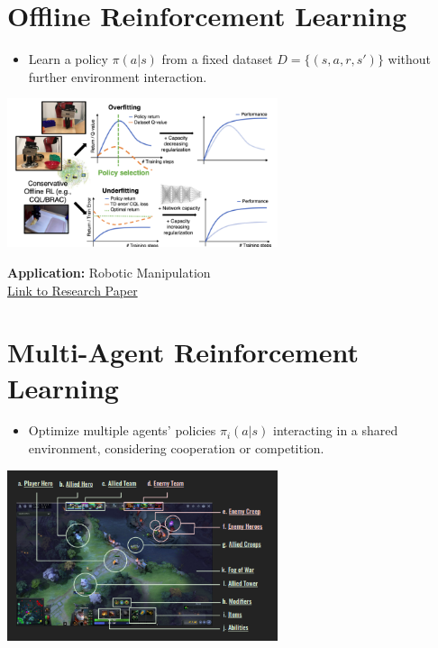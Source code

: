 \documentclass[
  letterpaper,
  DIV=11,
  numbers=noendperiod]{scrreprt}
\providecommand{\tightlist}{%
  \setlength{\itemsep}{0pt}\setlength{\parskip}{0pt}}\usepackage{longtable,booktabs,array}
\begin{document}
\section{Offline Reinforcement
Learning}\label{offline-reinforcement-learning}

\begin{itemize}
\tightlist
\item
  Learn a policy \(\pi(a|s)\) from a fixed dataset
  \(D = \{(s, a, r, s')\}\) without further environment interaction.
\end{itemize}

\includegraphics[width=3.125in,height=\textheight,keepaspectratio]{lecture12/images/OfflineReinforcementLearning.png}

\textbf{Application:} Robotic Manipulation\\
\href{https://arxiv.org/pdf/2109.10813}{Link to Research Paper}

\section{Multi-Agent Reinforcement
Learning}\label{multi-agent-reinforcement-learning}

\begin{itemize}
\tightlist
\item
  Optimize multiple agents' policies \(\pi_i(a|s)\) interacting in a
  shared environment, considering cooperation or competition.
\end{itemize}

\includegraphics[width=3.125in,height=\textheight,keepaspectratio]{lecture12/images/MultiAgentReinforcementLearning.png}
\end{document}
